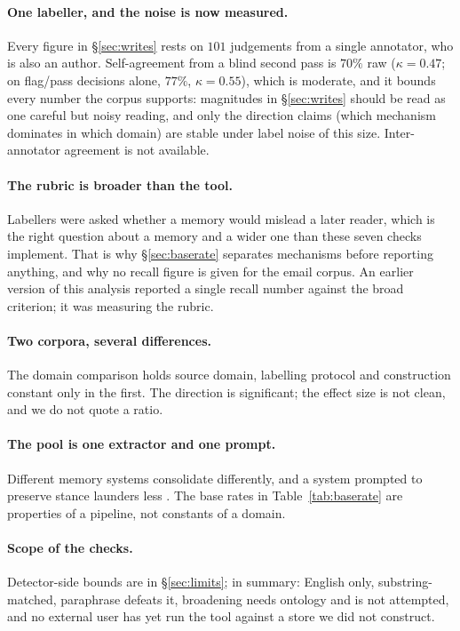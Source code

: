 \documentclass[11pt]{article}
\begin{document}
\paragraph{One labeller, and the noise is now measured.} Every figure in
\S\ref{sec:writes} rests on $101$ judgements from a single annotator, who is also an
author. Self-agreement from a blind second pass is $70\%$ raw ($\kappa = 0.47$; on
flag/pass decisions alone, $77\%$, $\kappa = 0.55$), which is moderate, and it bounds
every number the corpus supports: magnitudes in \S\ref{sec:writes} should be read as one
careful but noisy reading, and only the direction claims (which mechanism dominates in
which domain) are stable under label noise of this size. Inter-annotator agreement is
not available.

\paragraph{The rubric is broader than the tool.} Labellers were asked whether a memory
would mislead a later reader, which is the right question about a memory and a wider one
than these seven checks implement. That is why \S\ref{sec:baserate} separates mechanisms
before reporting anything, and why no recall figure is given for the email corpus. An
earlier version of this analysis reported a single recall number against the broad
criterion; it was measuring the rubric.

\paragraph{Two corpora, several differences.} The domain comparison holds source
domain, labelling protocol and construction constant only in the first. The direction is
significant; the effect size is not clean, and we do not quote a ratio.

\paragraph{The pool is one extractor and one prompt.} Different memory systems consolidate
differently, and a system prompted to preserve stance launders less
\citep{kwon2026mc}. The base rates in Table~\ref{tab:baserate} are properties of a
pipeline, not constants of a domain.

\paragraph{Scope of the checks.} Detector-side bounds are in \S\ref{sec:limits}; in
summary: English only, substring-matched, paraphrase defeats it, broadening needs
ontology and is not attempted, and no external user has yet run the tool against a store
we did not construct.
\end{document}
